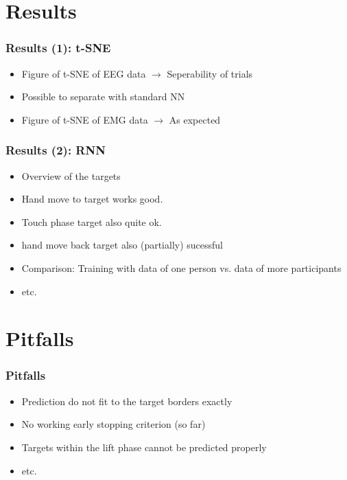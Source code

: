 \documentclass{beamer}
\begin{document}
\section{Results}



		
		
		
\begin{frame}
	\frametitle{Results (1): t-SNE}
	\begin{itemize}
		\item Figure of t-SNE of EEG data $\rightarrow$ Seperability of trials
		\item Possible to separate with standard NN
		\item Figure of t-SNE of EMG data $\rightarrow$ As expected
	\end{itemize}
\end{frame}

\begin{frame}
	\frametitle{Results (2): RNN}
	\begin{itemize}
		\item Overview of the targets
		\item Hand move to target works good.
		\item Touch phase target also quite ok.
		\item hand move back target also (partially) sucessful
		\item Comparison: Training with data of one person vs. data of more participants
		\item etc.
	\end{itemize}
\end{frame}

\section{Pitfalls}

\begin{frame}
	\frametitle{Pitfalls}
	\begin{itemize}
		\item Prediction do not fit to the target borders exactly
		\item No working early stopping criterion (so far)
		\item Targets within the lift phase cannot be predicted properly
		\item etc.
	\end{itemize}
\end{frame}
\end{document}
